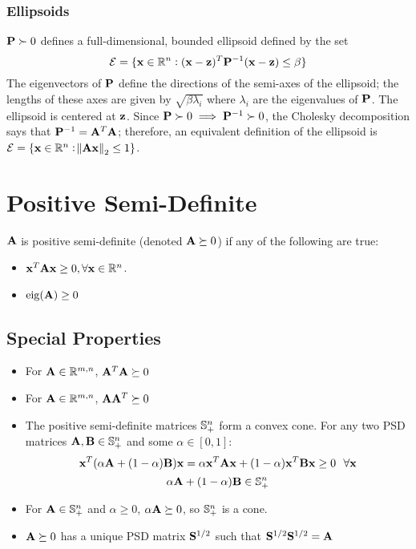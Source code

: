 \subsubsection{Ellipsoids}
$\mathbf{P}\succ0$ defines a full-dimensional, bounded ellipsoid defined by the set
\begin{equation}
\mathcal{E}=\{\mathbf{x}\in\mathbb{R}^{n}: (\mathbf{x}-\mathbf{z})^T\mathbf{P}^{-1}(\mathbf{x}-\mathbf{z})\le \beta\}
\end{equation}
The eigenvectors of $\mathbf{P}$ define the directions of the semi-axes of the ellipsoid; the lengths of these axes are given by $\sqrt{\beta\lambda_i}$ where $\lambda_i$ are the eigenvalues of $\mathbf{P}$. The ellipsoid is centered at $\mathbf{z}$. Since $\mathbf{P}\succ 0 \implies \mathbf{P}^{-1}\succ 0$, the Cholesky decomposition says that $\mathbf{P}^{-1}=\mathbf{A}^T\mathbf{A}$; therefore, an equivalent definition of the ellipsoid is $\mathcal{E}=\{\mathbf{x}\in\mathbb{R}^{n}: \norm{\mathbf{A}\mathbf{x}}_2\le1\}$.

\section{Positive Semi-Definite}

$\mathbf{A}$ is positive semi-definite (denoted $\mathbf{A}\succeq0$) if any of the following are true:
\begin{itemize}
\item $\mathbf{x}^T\mathbf{A}\mathbf{x}\ge0,\forall\mathbf{x}\in\mathbb{R}^{n}$.
\item $\operatorname{eig}(\mathbf{A})\ge0$
\end{itemize}

\subsection*{Special Properties}
\begin{itemize}
\item For $\mathbf{A}\in\mathbb{R}^{m,n}$, $\mathbf{A}^T\mathbf{A}\succeq0$
\item For $\mathbf{A}\in\mathbb{R}^{m,n}$, $\mathbf{A}\mathbf{A}^T\succeq0$
\item The positive semi-definite matrices $\mathbb{S}^n_+$ form a convex cone. For any two PSD matrices $\mathbf{A},\mathbf{B}\in\mathbb{S}^n_+$ and some $\alpha\in[0,1]$:
\begin{equation}
\mathbf{x}^T(\alpha\mathbf{A}+(1-\alpha)\mathbf{B})\mathbf{x}=\alpha \mathbf{x}^T\mathbf{A}\mathbf{x}+(1-\alpha)\mathbf{x}^T\mathbf{B}\mathbf{x}\ge0~~\forall\mathbf{x}
\end{equation}
\begin{equation}
\alpha\mathbf{A}+(1-\alpha)\mathbf{B}\in\mathbb{S}^n_+
\end{equation}
\item For $\mathbf{A}\in\mathbb{S}^n_+$ and $\alpha\ge0$, $\alpha\mathbf{A}\succeq0$, so $\mathbb{S}^n_+$ is a cone.
\item $\mathbf{A}\succeq 0$ has a unique PSD matrix $\mathbf{S}^{1/2}$ such that $\mathbf{S}^{1/2}\mathbf{S}^{1/2}=\mathbf{A}$
\end{itemize}

